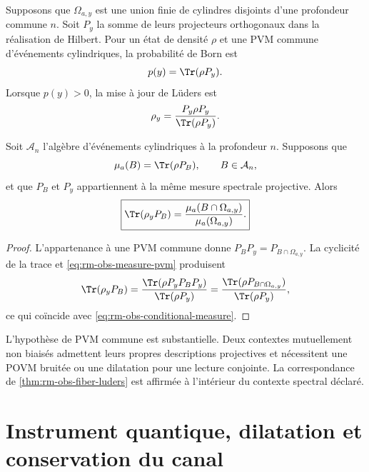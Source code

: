Supposons que \(\Omega_{a,y}\) est une union finie de cylindres
disjoints d'une profondeur commune \(n\). Soit \(P_y\) la somme de leurs
projecteurs orthogonaux dans la réalisation de Hilbert. Pour un état
de densité \(\rho\) et une PVM commune d'événements cylindriques, la probabilité
de Born est
\begin{equation}
 p(y)=\Tr(\rho P_y).
 \label{eq:rm-obs-born}
\end{equation}
Lorsque \(p(y)>0\), la mise à jour de Lüders \cite{Luders1951} est
\begin{equation}
 \rho_y=\frac{P_y\rho P_y}{\Tr(\rho P_y)}.
 \label{eq:rm-obs-luders}
\end{equation}

\begin{theorem}
\label{thm:rm-obs-fiber-luders}
Soit \(\mathcal A_n\) l'algèbre d'événements cylindriques à la profondeur
\(n\). Supposons que
\begin{equation}
 \mu_a(B)=\Tr(\rho P_B),
 \qquad B\in\mathcal A_n,
 \label{eq:rm-obs-measure-pvm}
\end{equation}
et que \(P_B\) et \(P_y\) appartiennent à la même mesure spectrale projective.
Alors
\begin{equation}
 \boxed{
 \Tr(\rho_yP_B)
 =\frac{\mu_a(B\cap\Omega_{a,y})}
 {\mu_a(\Omega_{a,y})}.}
 \label{eq:rm-obs-luders-fiber-equivalence}
\end{equation}
\end{theorem}

\begin{proof}
L'appartenance à une PVM commune donne
\(P_BP_y=P_{B\cap\Omega_{a,y}}\). La cyclicité de la trace et
\cref{eq:rm-obs-measure-pvm} produisent
\[
 \Tr(\rho_yP_B)
 =\frac{\Tr(\rho P_yP_BP_y)}{\Tr(\rho P_y)}
 =\frac{\Tr(\rho P_{B\cap\Omega_{a,y}})}
 {\Tr(\rho P_y)},
\]
ce qui coïncide avec \cref{eq:rm-obs-conditional-measure}.
\end{proof}

L'hypothèse de PVM commune est substantielle. Deux contextes mutuellement
non biaisés admettent leurs propres descriptions projectives et nécessitent une POVM
bruitée ou une dilatation pour une lecture conjointe. La correspondance de
\cref{thm:rm-obs-fiber-luders} est affirmée à l'intérieur du contexte spectral
déclaré.

\section{Instrument quantique, dilatation et conservation du canal}

